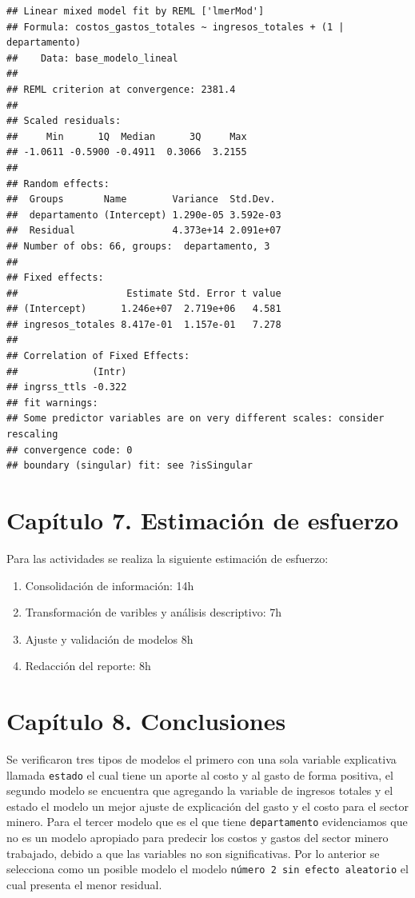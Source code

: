 \documentclass[
  11pt,
]{book}
\providecommand{\tightlist}{%
  \setlength{\itemsep}{0pt}\setlength{\parskip}{0pt}}
\begin{document}
\begin{verbatim}
## Linear mixed model fit by REML ['lmerMod']
## Formula: costos_gastos_totales ~ ingresos_totales + (1 | departamento)
##    Data: base_modelo_lineal
## 
## REML criterion at convergence: 2381.4
## 
## Scaled residuals: 
##     Min      1Q  Median      3Q     Max 
## -1.0611 -0.5900 -0.4911  0.3066  3.2155 
## 
## Random effects:
##  Groups       Name        Variance  Std.Dev. 
##  departamento (Intercept) 1.290e-05 3.592e-03
##  Residual                 4.373e+14 2.091e+07
## Number of obs: 66, groups:  departamento, 3
## 
## Fixed effects:
##                   Estimate Std. Error t value
## (Intercept)      1.246e+07  2.719e+06   4.581
## ingresos_totales 8.417e-01  1.157e-01   7.278
## 
## Correlation of Fixed Effects:
##             (Intr)
## ingrss_ttls -0.322
## fit warnings:
## Some predictor variables are on very different scales: consider rescaling
## convergence code: 0
## boundary (singular) fit: see ?isSingular
\end{verbatim}

\hypertarget{capuxedtulo-7.-estimaciuxf3n-de-esfuerzo}{%
\chapter{Capítulo 7. Estimación de
esfuerzo}\label{capuxedtulo-7.-estimaciuxf3n-de-esfuerzo}}

Para las actividades se realiza la siguiente estimación de esfuerzo:

\begin{enumerate}
\def\labelenumi{\arabic{enumi})}
\tightlist
\item
  Consolidación de información: 14h
\item
  Transformación de varibles y análisis descriptivo: 7h
\item
  Ajuste y validación de modelos 8h
\item
  Redacción del reporte: 8h
\end{enumerate}

\hypertarget{capuxedtulo-8.-conclusiones}{%
\chapter{Capítulo 8. Conclusiones}\label{capuxedtulo-8.-conclusiones}}

Se verificaron tres tipos de modelos el primero con una sola variable
explicativa llamada \texttt{estado} el cual tiene un aporte al costo y
al gasto de forma positiva, el segundo modelo se encuentra que agregando
la variable de ingresos totales y el estado el modelo un mejor ajuste de
explicación del gasto y el costo para el sector minero. Para el tercer
modelo que es el que tiene \texttt{departamento} evidenciamos que no es
un modelo apropiado para predecir los costos y gastos del sector minero
trabajado, debido a que las variables no son significativas. Por lo
anterior se selecciona como un posible modelo el modelo
\texttt{número\ 2\ sin\ efecto\ aleatorio} el cual presenta el menor
residual.
\end{document}
